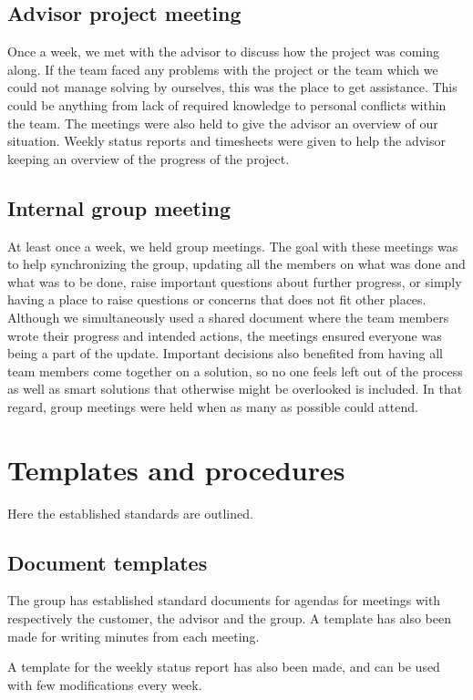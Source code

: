 \documentclass[11pt]{book}
\begin{document}
\subsection{Advisor project meeting}
Once a week, we met with the advisor to discuss how the project was coming along. If the team faced any problems with the project or the team which we could not manage solving by ourselves, this was the place to get assistance. This could be anything from lack of required knowledge to personal conflicts within the team. The meetings were also held to give the advisor an overview of our situation. Weekly status reports and timesheets were given to help the advisor keeping an overview of the progress of the project.

\subsection{Internal group meeting}
At least once a week, we held group meetings. The goal with these meetings was to help synchronizing the group, updating all the members on what was done and what was to be done, raise important questions about further progress, or simply having a place to raise questions or concerns that does not fit other places. Although we simultaneously used a shared document where the team members wrote their progress and intended actions, the meetings ensured everyone was being a part of the update. Important decisions also benefited from having all team members come together on a solution, so no one feels left out of the process as well as smart solutions that otherwise might be overlooked is included.  In that regard, group meetings were held when as many as possible could attend.

\section{Templates and procedures}
Here the established standards are outlined.

\subsection{Document templates}
The group has established standard documents for agendas for meetings with respectively the customer, the advisor and the group. A template has also been made for writing minutes from each meeting.

A template for the weekly status report has also been made, and can be used with few modifications every week.
\end{document}
